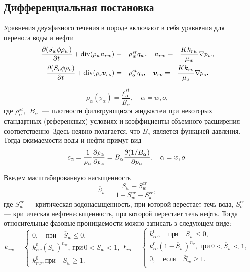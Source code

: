 \subsection{Дифференциальная постановка}

Уравнения двухфазного течения в породе включают в себя уравнения для переноса воды и нефти
\begin{equation}\label{eq:egor_common_equation_multiphase_rho}
\begin{split}
	\dfrac{\partial (S_w \phi \rho_w)}{\partial t} + \operatorname{div}(\rho_w \bm{v}_{rw})    &= - \rho^{st}_w q_w, \quad \bm{v}_{rw}=-\frac{K k_{rw}}{\mu_w}\nabla p_w,\\
	\dfrac{\partial (S_o \phi \rho_o)}{\partial t} + \operatorname{div}(\rho_o \bm{v}_{ro})  &= - \rho^{st}_o q_o, \quad \bm{v}_{ro}=-\frac{K k_{ro}}{\mu_o}\nabla p_o.
\end{split}
\end{equation}

$$
\rho_\alpha(p_\alpha) = \frac{\rho^{st}_\alpha}{B_\alpha}, \quad \alpha = w,o,
$$
где $\rho^{st}_\alpha,$~$B_\alpha$~---~плотности фильтрующихся жидкостей при некоторых стандартных (референсных) условиях и  коэффициенты объемного расширения соответственно. 
Здесь неявно полагается, что $B_\alpha$ является функцией давления.
Тогда сжимаемости воды и нефти примут вид 
\begin{equation}\label{eq:sibin_c_alpha}
c_\alpha = \frac{1}{\rho_\alpha} \dfrac{\partial \rho_\alpha}{\partial p_\alpha} = B_\alpha \dfrac{\partial (1 / B_\alpha)}{\partial p_\alpha}, \quad \alpha = w,o.
\end{equation}

Введем масштабированную насыщенность
\begin{equation}\label{eq:star:mod:Sw}
 \overline {S}_w= \frac{S_w-S_w^{cr}}{1-S_w^{cr}-S_o^{cr}},
\end{equation}
где $S_w^{cr}$ --- критическая водонасыщенность, при которой перестает течь вода, $S_o^{cr}$ --- критическая нефтенасыщенность, при которой перестает течь нефть. Тогда относительные фазовые проницаемости можно записать в следующем виде:
\begin{equation}\label{eq:star:mod:RelatPerm}
	k_{rw}= \begin{cases}
	0, \quad \text{при}\quad \overline {S}_w \leq 0,\\
	k_{rw}^0 (\overline {S}_w)^{n_w}, \,\text{при}\,0<\overline {S}_w <1, \\
	k_{rw}^0, \text{при}\quad \overline {S}_w \geq 1.
   \end{cases}
   k_{ro}=\begin{cases}
	k_{ro}^0, \quad \text{при}\quad \overline {S}_w \leq 0, \\
	k_{ro}^0 (1-\overline {S}_w)^{n_o}, \, \text{при}\,0<\overline {S}_w<1 , \\
   0, \quad \text{если}\quad \overline {S}_w \geq 1.\\
   \end{cases}
\end{equation}

